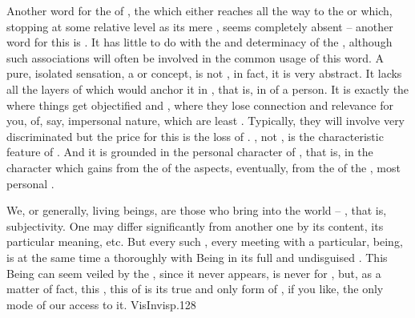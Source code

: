 


\pa Another word for the  of , the  which
either reaches all the way to the  or which, stopping at some
relative level as its mere , seems completely absent -- another
word for this  is . It has little to do with the
 and determinacy of the , although such associations
will often be involved in the common usage of this word. A pure, isolated
sensation, a  or concept, is not , in fact, it
is very abstract. It lacks all the layers of  which would
anchor it in  , that is, in  of a
person. It is exactly the  where things get {objectified} and
, where they lose connection and relevance for you,
 of, say, impersonal nature, which are least .
Typically, they will involve very  discriminated  but
the price for this  is the loss of .
, not , is the characteristic feature of
. And it is grounded in the personal character of
, that is, in the character which  gains from the
 of the  aspects, eventually, from the 
of the , most personal .

We, or generally, living beings, are those who bring  into the
world -- , that is, subjectivity.  One  may
differ significantly from another one by its  content, its
particular meaning, etc.  But every such , every meeting with a
particular,  being, is at the same time a thoroughly 
 with Being in its full and undisguised .  This
Being can seem veiled by the , since it never appears, is never
 for , but, as a matter of fact, this
, this  of  is its true and only
form of , if you like, the only mode of our access to it. \citet{If
  coincidence is lost, then it is not an accident; if Being remains hidden, then
  this is precisely its very feature and no unveiling will allow us understand
  it.}{VisInvis}{p.128}

